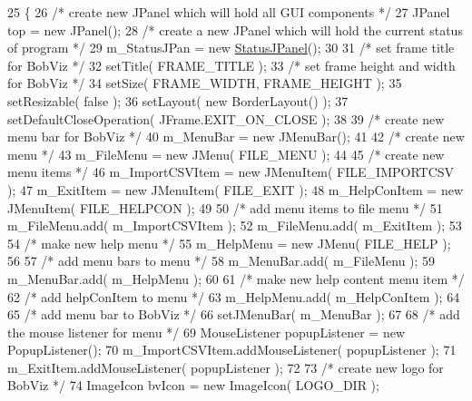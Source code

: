 \begin{DoxyCode}
25                     \{
26         \textcolor{comment}{/* create new JPanel which will hold all GUI components */}
27         JPanel top = \textcolor{keyword}{new} JPanel();
28         \textcolor{comment}{/* create a new JPanel which will hold the current status of program */}
29         m\_StatusJPan = \textcolor{keyword}{new} \hyperlink{class_status_j_panel}{StatusJPanel}();
30         
31         \textcolor{comment}{/* set frame title for BobViz */}
32         setTitle( FRAME\_TITLE );
33         \textcolor{comment}{/* set frame height and width for BobViz */}
34         setSize( FRAME\_WIDTH, FRAME\_HEIGHT );
35         setResizable( \textcolor{keyword}{false} );
36         setLayout( \textcolor{keyword}{new} BorderLayout() );
37         setDefaultCloseOperation( JFrame.EXIT\_ON\_CLOSE );
38 
39         \textcolor{comment}{/* create new menu bar for BobViz */}
40         m\_MenuBar = \textcolor{keyword}{new} JMenuBar();
41 
42         \textcolor{comment}{/* create new menu */}
43         m\_FileMenu = \textcolor{keyword}{new} JMenu( FILE\_MENU );
44 
45         \textcolor{comment}{/* create new menu items */}
46         m\_ImportCSVItem = \textcolor{keyword}{new} JMenuItem( FILE\_IMPORTCSV );
47         m\_ExitItem = \textcolor{keyword}{new} JMenuItem( FILE\_EXIT );
48         m\_HelpConItem = \textcolor{keyword}{new} JMenuItem( FILE\_HELPCON );
49         
50         \textcolor{comment}{/* add menu items to file menu */}
51         m\_FileMenu.add( m\_ImportCSVItem );
52         m\_FileMenu.add( m\_ExitItem );
53 
54         \textcolor{comment}{/* make new help menu */}
55         m\_HelpMenu = \textcolor{keyword}{new} JMenu( FILE\_HELP );
56         
57         \textcolor{comment}{/* add menu bars to menu */}
58         m\_MenuBar.add( m\_FileMenu );
59         m\_MenuBar.add( m\_HelpMenu );
60         
61         \textcolor{comment}{/* make new help content menu item */}
62         \textcolor{comment}{/* add helpConItem to menu */}
63         m\_HelpMenu.add( m\_HelpConItem );
64         
65         \textcolor{comment}{/* add menu bar to BobViz */}
66         setJMenuBar( m\_MenuBar );
67         
68         \textcolor{comment}{/* add the mouse listener for menu */}
69         MouseListener popupListener = \textcolor{keyword}{new} PopupListener();
70         m\_ImportCSVItem.addMouseListener( popupListener );
71         m\_ExitItem.addMouseListener( popupListener );
72         
73         \textcolor{comment}{/* create new logo for BobViz */}
74         ImageIcon bvIcon = \textcolor{keyword}{new} ImageIcon( LOGO\_DIR );

\end{DoxyCode}
